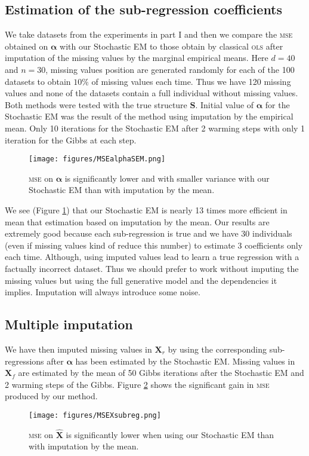 \documentclass[12pt,a4paper]{report}
\begin{document}
		\subsection{Estimation of the sub-regression coefficients}
			We take datasets from the experiments in part I and then we compare the \textsc{mse} obtained on $\boldsymbol{\alpha}$ with our Stochastic EM to those obtain by classical \textsc{ols} after imputation of the missing values by the marginal empirical means. Here $d=40$ and $n=30$, missing values position are generated randomly for each of the 100 datasets to obtain $10 \%$ of missing values each time. Thus we have 120 missing values and none of the datasets contain a full individual without missing values.
Both methods were tested with the true structure $\boldsymbol{S}$. Initial value of $\boldsymbol{\alpha}$ for the Stochastic EM was the result of the method using imputation by the empirical mean. Only 10 iterations for the Stochastic EM after 2 warming steps with only 1 iteration for the Gibbs at each step.

\begin{figure}[h!]
	\centering
	\texttt{[image: figures/MSEalphaSEM.png]} 
	\caption{\textsc{mse} on $\boldsymbol{\alpha}$ is significantly lower and with smaller variance with our Stochastic EM than with imputation by the mean.}\label{MSEalphaSEM}
\end{figure}

	We see (Figure \ref{MSEalphaSEM}) that our Stochastic EM is nearly 13 times more efficient in mean that estimation based on imputation by the mean. Our results are extremely good because each sub-regression is true and we have 30 individuals (even if missing values kind of reduce this number) to estimate 3 coefficients only each time. Although, using imputed values lead to learn a true regression with a factually incorrect dataset. Thus we should prefer to work without imputing the missing values but using the full generative model and the dependencies it implies. Imputation will always introduce some noise.

		
			\subsection{Multiple imputation}
			We have then imputed missing values in $\boldsymbol{X}_r$  by using the corresponding sub-regressions after $\boldsymbol{\alpha}$ has been estimated  by the Stochastic EM.
			Missing values in $\boldsymbol{X}_f$ are estimated by the mean of 50 Gibbs iterations after the Stochastic EM and 2 warming steps of the Gibbs. Figure \ref{MSEXsubreg} shows the significant gain in \textsc{mse} produced by our method.
			\begin{figure}[h!]
	\centering
	\texttt{[image: figures/MSEXsubreg.png]} 
	\caption{\textsc{mse} on $\hat{\boldsymbol{X}}$ is significantly lower when using our Stochastic EM than with imputation by the mean.}\label{MSEXsubreg}
\end{figure}  
\FloatBarrier
\end{document}
